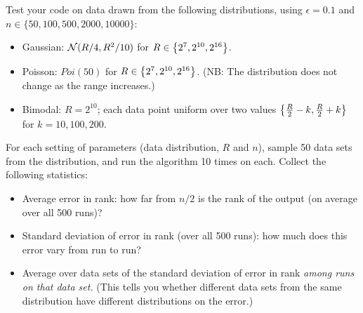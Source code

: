 \documentclass[11pt]{article}
\begin{document}
\begin{enumerate}[leftmargin=\parindent, itemsep=3ex]
           Test your code on data drawn from the following
           distributions, using $\epsilon = 0.1$ and $n \in \{50,100,500, 2000, 10000\}$:
           \begin{itemize}
           \item Gaussian: $\mathcal{N}(R/4, R^2/10)$ for $R \in
             \left\{ 2^7,2^{10}, 2^{16} \right\}$. 
           \item Poisson: $\textit{Poi}(50)$ for $R \in 
             \left\{ 2^7,2^{10}, 2^{16} \right\}$. (NB: The distribution does not
             change as the range increases.)
           \item Bimodal: $R=2^{10}$; each data point uniform over two
             values $\left\{ \frac{R}{2}-k, \frac{R}{2}+k \right\}$ for $k = 10, 100, 200$.
             \end{itemize}
             For each setting of parameters (data distribution, $R$
             and $n$), sample 50 data sets from the distribution, and
             run the algorithm 10 times on each. Collect the following
             statistics:
             \begin{itemize}
             \item Average error in rank: how far from $n/2$ is the
               rank of the output (on average over all 500 runs)?
             \item Standard deviation of error in rank (over all 500
               runs): how much does this error vary from run to run?
             \item Average over data sets of the standard deviation of error in rank \emph{among runs on
               that data set.} (This tells you whether different data
             sets from the same distribution have different
             distributions on the error.)
           \end{itemize}

           
             
             

\end{enumerate}
\end{document}
